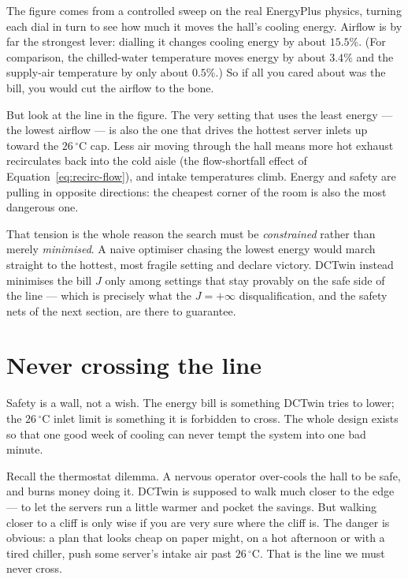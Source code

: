 The figure comes from a controlled sweep on the real EnergyPlus physics, turning each dial in turn to see how much it moves the hall's cooling energy. Airflow is by far the strongest lever: dialling it changes cooling energy by about $15.5\%$. (For comparison, the chilled-water temperature moves energy by about $3.4\%$ and the supply-air temperature by only about $0.5\%$.) So if all you cared about was the bill, you would cut the airflow to the bone.

But look at the line in the figure. The very setting that uses the least energy --- the lowest airflow --- is also the one that drives the hottest server inlets up toward the $26\,^\circ$C cap. Less air moving through the hall means more hot exhaust recirculates back into the cold aisle (the flow-shortfall effect of Equation~\ref{eq:recirc-flow}), and intake temperatures climb. Energy and safety are pulling in opposite directions: the cheapest corner of the room is also the most dangerous one.

That tension is the whole reason the search must be \emph{constrained} rather than merely \emph{minimised}. A naive optimiser chasing the lowest energy would march straight to the hottest, most fragile setting and declare victory. DCTwin instead minimises the bill $J$ only among settings that stay provably on the safe side of the line --- which is precisely what the $J = +\infty$ disqualification, and the safety nets of the next section, are there to guarantee.

\section{Never crossing the line}

\begin{keyidea}
Safety is a wall, not a wish. The energy bill is something DCTwin tries to lower; the $26\,^\circ$C inlet limit is something it is forbidden to cross. The whole design exists so that one good week of cooling can never tempt the system into one bad minute.
\end{keyidea}

Recall the thermostat dilemma. A nervous operator over-cools the hall to be safe, and burns money doing it. DCTwin is supposed to walk much closer to the edge --- to let the servers run a little warmer and pocket the savings. But walking closer to a cliff is only wise if you are very sure where the cliff is. The danger is obvious: a plan that looks cheap on paper might, on a hot afternoon or with a tired chiller, push some server's intake air past $26\,^\circ$C. That is the line we must never cross.

